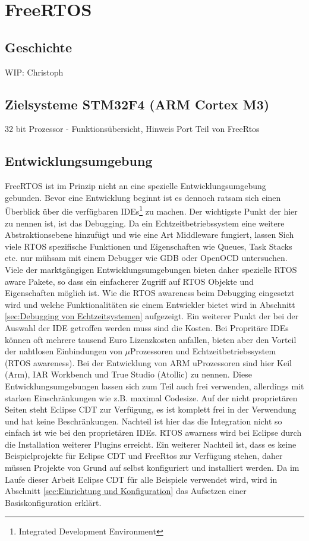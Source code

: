 \documentclass[ngerman]{seminarvorlage}
\begin{document}
\section{FreeRTOS} 
\subsection{Geschichte}
WIP: Christoph
\subsection{Zielsysteme STM32F4 (ARM Cortex M3)}
32 bit Prozessor - Funktionsübersicht, Hinweis Port Teil von FreeRtos
\subsection{Entwicklungsumgebung}
FreeRTOS ist im Prinzip nicht an eine spezielle Entwicklungsumgebung gebunden. Bevor eine Entwicklung be\-ginnt ist es dennoch ratsam sich einen Überblick über die ver\-fügbaren IDEs\footnote{Integrated Development Environment} zu machen. Der wichtigste Punkt der hier zu nennen ist, ist das Debugging. Da ein Echtzeitbetriebssystem eine weitere Abstraktionsebene hinzufügt und wie eine Art Middleware fungiert, lassen Sich viele RTOS spezifische Funktionen und Eigenschaften wie Queues, Task Stacks etc. nur mühsam mit einem Debugger wie GDB oder OpenOCD untersuchen. Viele der marktgängigen Entwicklungsumgebungen bieten daher spezielle RTOS aware Pakete, so dass ein einfacherer Zugriff auf RTOS Objekte und Eigenschaften möglich ist. Wie die RTOS awareness beim Debugging eingesetzt wird und welche Funktionalitäten sie einem Entwickler bietet wird in Abschnitt \ref{sec:Debugging von Echtzeitsystemen} aufgezeigt. Ein weiterer Punkt der bei der Auswahl der IDE getroffen werden muss sind die Kosten. Bei Propritäre IDEs können oft mehrere tausend Euro Lizenzkosten anfallen, bieten aber den Vorteil der nahtlosen Einbindungen von $\mu$Prozessoren und Echtzeitbetriebssystem (RTOS awareness). Bei der Entwicklung von ARM uProzessoren sind hier Keil (Arm), IAR Workbench und True Studio (Atollic) zu nennen. Diese Entwicklungsumgebungen lassen sich zum Teil auch frei verwenden, allerdings mit starken Einschränkungen wie z.B. maximal Codesize. Auf der nicht proprietären Seiten steht Eclipse CDT zur Verfügung, es ist komplett frei in der Verwendung und hat keine Beschränkungen. Nachteil ist hier das die Integration nicht so einfach ist wie bei den proprietären IDEs. RTOS awarness wird bei Eclipse durch die Installation weiterer Plugins erreicht. Ein weiterer Nachteil ist, dass es keine Beispielprojekte für Eclipse CDT und FreeRtos zur Verfügung stehen, daher müssen Projekte von Grund auf selbst konfiguriert und installiert werden. Da im Laufe dieser Arbeit Eclipse CDT für alle Beispiele verwendet wird, wird in Abschnitt \ref{sec:Einrichtung und Konfiguration} das Aufsetzen einer Basiskonfiguration erklärt. 
\end{document}
